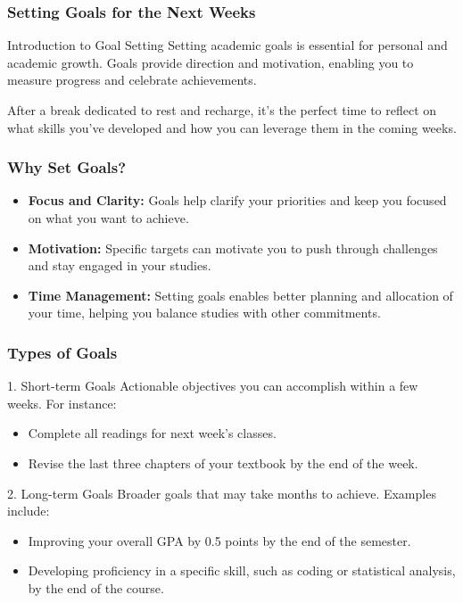 \documentclass[aspectratio=169]{beamer}
\begin{document}
\begin{frame}[fragile]
    \frametitle{Setting Goals for the Next Weeks}
    \begin{block}{Introduction to Goal Setting}
        Setting academic goals is essential for personal and academic growth. Goals provide direction and motivation, enabling you to measure progress and celebrate achievements. 
    \end{block}
    After a break dedicated to rest and recharge, it's the perfect time to reflect on what skills you've developed and how you can leverage them in the coming weeks.
\end{frame}

\begin{frame}[fragile]
    \frametitle{Why Set Goals?}
    \begin{itemize}
        \item \textbf{Focus and Clarity:} Goals help clarify your priorities and keep you focused on what you want to achieve.
        \item \textbf{Motivation:} Specific targets can motivate you to push through challenges and stay engaged in your studies.
        \item \textbf{Time Management:} Setting goals enables better planning and allocation of your time, helping you balance studies with other commitments.
    \end{itemize}
\end{frame}

\begin{frame}[fragile]
    \frametitle{Types of Goals}
    \begin{block}{1. Short-term Goals}
        Actionable objectives you can accomplish within a few weeks. For instance:
        \begin{itemize}
            \item Complete all readings for next week’s classes.
            \item Revise the last three chapters of your textbook by the end of the week.
        \end{itemize}
    \end{block}
    
    \begin{block}{2. Long-term Goals}
        Broader goals that may take months to achieve. Examples include:
        \begin{itemize}
            \item Improving your overall GPA by 0.5 points by the end of the semester.
            \item Developing proficiency in a specific skill, such as coding or statistical analysis, by the end of the course.
        \end{itemize}
    \end{block}
\end{frame}
\end{document}

